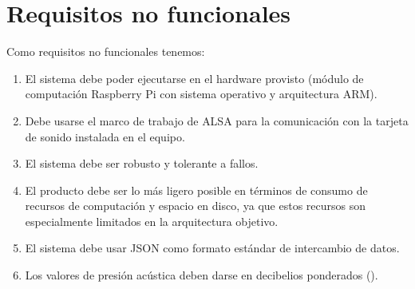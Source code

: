 \section{Requisitos no funcionales} \label{sec:rnf}

Como requisitos no funcionales tenemos:

\begin{enumerate}
    \item El sistema debe poder ejecutarse en el hardware provisto (módulo de computación Raspberry Pi con sistema operativo  y arquitectura \acrshort{ARM}).

    \item Debe usarse el marco de trabajo de \acrshort{ALSA} para la comunicación con la tarjeta de sonido instalada en el equipo.

    \item El sistema debe ser robusto y tolerante a fallos.

    \item El producto debe ser lo más ligero posible en términos de consumo de recursos de computación y espacio en disco, ya que estos recursos son especialmente limitados en la arquitectura objetivo.

    \item El sistema debe usar \acrshort{JSON} como formato estándar de intercambio de datos.

    \item Los valores de presión acústica deben darse en decibelios ponderados ().
\end{enumerate}